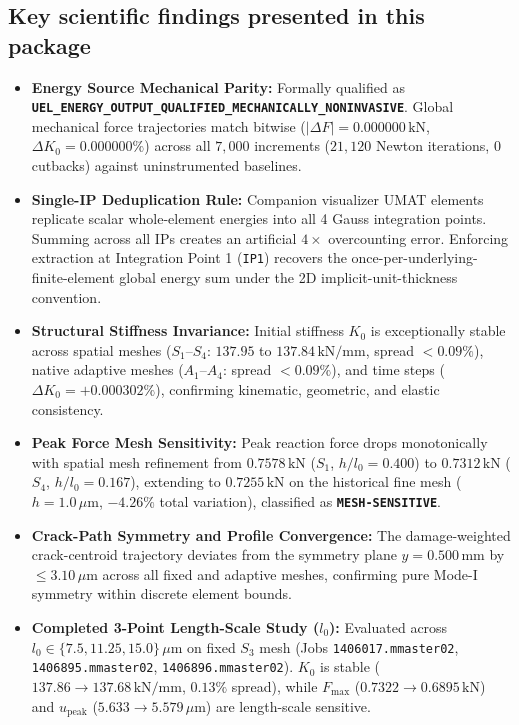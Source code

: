 \subsection{Key scientific findings presented in this package}
\begin{itemize}[leftmargin=5mm,itemsep=2pt]
  \item \textbf{Energy Source Mechanical Parity:} Formally qualified as \textbf{\texttt{UEL\_ENERGY\_OUTPUT\_QUALIFIED\_MECHANICALLY\_NONINVASIVE}}. Global mechanical force trajectories match bitwise ($|\Delta F| = 0.000000\,\mathrm{kN}$, $\Delta K_0 = 0.000000\%$) across all $7{,}000$ increments ($21{,}120$ Newton iterations, 0 cutbacks) against uninstrumented baselines.
  \item \textbf{Single-IP Deduplication Rule:} Companion visualizer UMAT elements replicate scalar whole-element energies into all 4 Gauss integration points. Summing across all IPs creates an artificial $4\times$ overcounting error. Enforcing extraction at Integration Point 1 (\texttt{IP1}) recovers the once-per-underlying-finite-element global energy sum under the 2D implicit-unit-thickness convention.
  \item \textbf{Structural Stiffness Invariance:} Initial stiffness $K_0$ is exceptionally stable across spatial meshes ($S_1$--$S_4$: $137.95$ to $137.84\,\mathrm{kN/mm}$, spread $<0.09\%$), native adaptive meshes ($A_1$--$A_4$: spread $<0.09\%$), and time steps ($\Delta K_0 = +0.000302\%$), confirming kinematic, geometric, and elastic consistency.
  \item \textbf{Peak Force Mesh Sensitivity:} Peak reaction force drops monotonically with spatial mesh refinement from $0.7578\,\mathrm{kN}$ ($S_1$, $h/l_0 = 0.400$) to $0.7312\,\mathrm{kN}$ ($S_4$, $h/l_0 = 0.167$), extending to $0.7255\,\mathrm{kN}$ on the historical fine mesh ($h = 1.0\,\mu\mathrm{m}$, $-4.26\%$ total variation), classified as \textbf{\texttt{MESH-SENSITIVE}}.
  \item \textbf{Crack-Path Symmetry and Profile Convergence:} The damage-weighted crack-centroid trajectory deviates from the symmetry plane $y = 0.500\,\mathrm{mm}$ by $\le 3.10\,\mu\mathrm{m}$ across all fixed and adaptive meshes, confirming pure Mode-I symmetry within discrete element bounds.
  \item \textbf{Completed 3-Point Length-Scale Study ($l_0$):} Evaluated across $l_0 \in \{7.5, 11.25, 15.0\}\,\mu\mathrm{m}$ on fixed $S_3$ mesh (Jobs \texttt{1406017.mmaster02}, \texttt{1406895.mmaster02}, \texttt{1406896.mmaster02}). $K_0$ is stable ($137.86 \to 137.68\,\mathrm{kN/mm}$, $0.13\%$ spread), while $F_{\max}$ ($0.7322 \to 0.6895\,\mathrm{kN}$) and $u_{\mathrm{peak}}$ ($5.633 \to 5.579\,\mu\mathrm{m}$) are length-scale sensitive.
\end{itemize}
